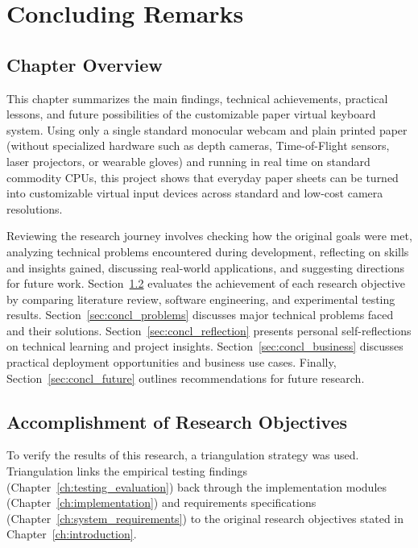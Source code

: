 \chapter{Concluding Remarks}
\label{ch:concluding_remarks}

\section{Chapter Overview}
\label{sec:concl_overview}
This chapter summarizes the main findings, technical achievements, practical lessons, and future possibilities of the customizable paper virtual keyboard system. Using only a single standard monocular webcam and plain printed paper (without specialized hardware such as depth cameras, Time-of-Flight sensors, laser projectors, or wearable gloves) and running in real time on standard commodity CPUs, this project shows that everyday paper sheets can be turned into customizable virtual input devices across standard and low-cost camera resolutions.

Reviewing the research journey involves checking how the original goals were met, analyzing technical problems encountered during development, reflecting on skills and insights gained, discussing real-world applications, and suggesting directions for future work. Section~\ref{sec:concl_objectives} evaluates the achievement of each research objective by comparing literature review, software engineering, and experimental testing results. Section~\ref{sec:concl_problems} discusses major technical problems faced and their solutions. Section~\ref{sec:concl_reflection} presents personal self-reflections on technical learning and project insights. Section~\ref{sec:concl_business} discusses practical deployment opportunities and business use cases. Finally, Section~\ref{sec:concl_future} outlines recommendations for future research.

\section{Accomplishment of Research Objectives}
\label{sec:concl_objectives}
To verify the results of this research, a triangulation strategy was used. Triangulation links the empirical testing findings (Chapter~\ref{ch:testing_evaluation}) back through the implementation modules (Chapter~\ref{ch:implementation}) and requirements specifications (Chapter~\ref{ch:system_requirements}) to the original research objectives stated in Chapter~\ref{ch:introduction}.


